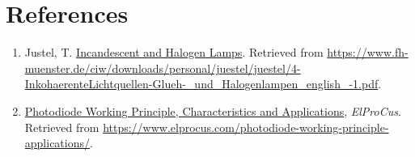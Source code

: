 \section*{References}

\begin{enumerate}

\item Justel, T. \href{https://www.fh-muenster.de/ciw/downloads/personal/juestel/juestel/4-InkohaerenteLichtquellen-Glueh-_und_Halogenlampen_english_-1.pdf}{Incandescent and Halogen Lamps}. Retrieved from \url{https://www.fh-muenster.de/ciw/downloads/personal/juestel/juestel/4-InkohaerenteLichtquellen-Glueh-_und_Halogenlampen_english_-1.pdf}.

\item \href{https://www.elprocus.com/photodiode-working-principle-applications/}{Photodiode Working Principle, Characteristics and Applications}, \textit{ElProCus}. Retrieved from \url{https://www.elprocus.com/photodiode-working-principle-applications/}.

\end{enumerate}



\newpage